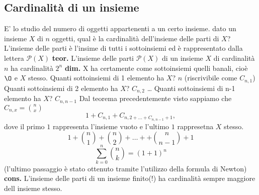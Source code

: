 \subsection*{Cardinalità di un insieme}
E' lo studio del numero di oggetti appartenenti a un certo insieme.
dato un insieme $X$ di $n$ oggetti, qual è la cardinalità dell'insieme delle parti di $X$?
L'insieme delle parti è l'insime di tutti i sottoinsiemi ed è rappresentato dalla lettera $\mathcal{P}(X)$
\newline
\textbf{teor.} L'insieme delle parti $\mathcal{P}(X)$ di un insieme $X$ di cardinalità $n$ ha cardinalità $2^n$
\newline
\textbf{dim.} X ha certamente come sottoinsiemi quelli banali, cioè $\O$ e $X$ stesso.
\newline
Quanti sottoinsiemi di 1 elemento ha $X$? $n$ (riscrivibile come $C_{n,1}$)
\newline
Quanti sottoinsiemi di 2 elemento ha $X$? $C_{n,2}$
\newline
\dots
\newline
Quanti sottoinsiemi di n-1 elemento ha $X$? $C_{n,n-1}$
\newline
Dal teorema precedentemente visto sappiamo che $C_{n,x} = \binom{n}{x}$
\[
    1+C_{n,1}+C_{n,2+\dots+C_{n,n-1}+1}
,\] 
dove il primo $1$ rappresenta l'insieme vuoto e l'ultimo $1$ rappresetna $X$ stesso.
\[
    1+\binom{n}{1}+\binom{n}{2}+\dots++\binom{n}{n-1}+1
\]
\[
    \sum_{k=0}^n\binom{n}{k} = (1+1)^n
\]  
(l'ultimo passaggio è stato ottenuto tramite l'utilizzo della formula di Newton)
\newline
\textbf{cons.} L'insieme delle parti di un insieme finito(!) ha cardinalità sempre maggiore dell insieme stesso.

